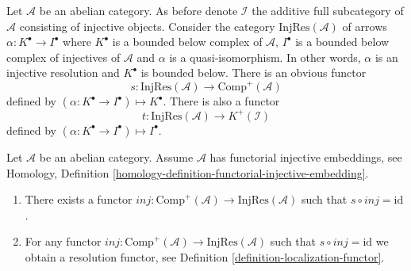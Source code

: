 \medskip\noindent
Let $\mathcal{A}$ be an abelian category. As before denote $\mathcal{I}$
the additive full subcategory of $\mathcal{A}$ consisting of injective
objects. Consider the category $\text{InjRes}(\mathcal{A})$
of arrows $\alpha : K^\bullet \to I^\bullet$
where $K^\bullet$ is a bounded below complex of $\mathcal{A}$,
$I^\bullet$ is a bounded below complex of injectives of $\mathcal{A}$
and $\alpha$ is a quasi-isomorphism. In other words, $\alpha$ is
an injective resolution and $K^\bullet$ is bounded below.
There is an obvious functor
$$
s : \text{InjRes}(\mathcal{A}) \longrightarrow \text{Comp}^{+}(\mathcal{A})
$$
defined by $(\alpha : K^\bullet \to I^\bullet) \mapsto K^\bullet$.
There is also a functor
$$
t : \text{InjRes}(\mathcal{A}) \longrightarrow K^{+}(\mathcal{I})
$$
defined by $(\alpha : K^\bullet \to I^\bullet) \mapsto I^\bullet$.

\begin{lemma}
\label{lemma-functorial-injective-resolutions}
Let $\mathcal{A}$ be an abelian category.
Assume $\mathcal{A}$ has functorial injective embeddings, see
Homology, Definition \ref{homology-definition-functorial-injective-embedding}.
\begin{enumerate}
\item There exists a functor
$inj : \text{Comp}^{+}(\mathcal{A}) \to \text{InjRes}(\mathcal{A})$
such that $s \circ inj = \text{id}$.
\item For any functor
$inj : \text{Comp}^{+}(\mathcal{A}) \to \text{InjRes}(\mathcal{A})$
such that $s \circ inj = \text{id}$ we obtain a resolution functor, see
Definition \ref{definition-localization-functor}.
\end{enumerate}
\end{lemma}

